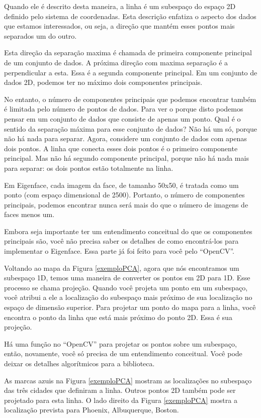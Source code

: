 Quando ele é descrito desta maneira, a linha é um subespaço do espaço 2D definido pelo sistema de coordenadas. Esta descrição enfatiza o aspecto dos dados que estamos interessados, ou seja, a direção que mantém esses pontos mais separados um do outro.

Esta direção da separação maxima é chamada de primeira componente principal de um conjunto de dados. A próxima direção com maxima separação é a perpendicular a esta. Essa é a segunda componente principal. Em um conjunto de dados 2D, podemos ter no máximo dois componentes principais.

No entanto, o número de componentes principais que podemos encontrar também é limitada pelo número de pontos de dados. Para ver o porque disto podemos pensar em um conjunto de dados que consiste de apenas um ponto. Qual é o sentido da separação máxima para esse conjunto de dados? Não há um só, porque não há nada para separar. Agora, considere um conjunto de dados com apenas dois pontos. A linha que conecta esses dois pontos é o primeiro componente principal. Mas não há segundo componente principal, porque não há nada mais para separar: os dois pontos estão totalmente na linha.

Em Eigenface, cada imagem da face, de tamanho 50x50, é tratada como um ponto (com espaço dimensional de 2500). Portanto, o número de componentes principais, podemos encontrar nunca será mais do que o número de imagens de faces menos um.

Embora seja importante ter um entendimento conceitual do que os componentes principais são, você não precisa saber os detalhes de como encontrá-los para implementar o Eigenface. Essa parte já foi feito para você pelo ``OpenCV''.

Voltando ao mapa da Figura \ref{exemploPCA}, agora que nós encontramos um subespaço 1D, temos uma maneira de converter os pontos em 2D para 1D. Esse processo se chama projeção. Quando você projeta um ponto em um subespaço, você atribui a ele a localização do subespaço mais próximo de sua localização no espaço de dimensão superior. Para projetar um ponto do mapa para a linha, você encontra o ponto da linha que está mais próximo do ponto 2D. Essa é sua projeção.

Há uma função no ``OpenCV'' para projetar os pontos sobre um subespaço, então, novamente, você só precisa de um entendimento conceitual. Você pode deixar os detalhes algorítmicos para a biblioteca.

As marcas azuis na Figura \ref{exemploPCA} mostram as localizações no subespaço das três cidades que definiram a linha. Outros pontos 2D também pode ser projetado para esta linha. O lado direito da Figura \ref{exemploPCA} mostra a localização prevista para Phoenix, Albuquerque, Boston.

